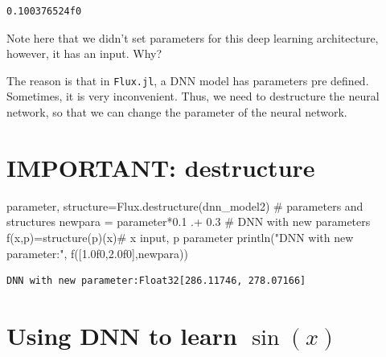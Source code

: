 \documentclass[
  letterpaper,
  DIV=11,
  numbers=noendperiod]{scrreport}
\newenvironment{Shaded}{\begin{snugshade}}{\end{snugshade}}
\newcommand{\CommentTok}[1]{\textcolor[rgb]{0.37,0.37,0.37}{#1}}
\newcommand{\FloatTok}[1]{\textcolor[rgb]{0.68,0.00,0.00}{#1}}
\newcommand{\FunctionTok}[1]{\textcolor[rgb]{0.28,0.35,0.67}{#1}}
\newcommand{\NormalTok}[1]{\textcolor[rgb]{0.00,0.23,0.31}{#1}}
\newcommand{\OperatorTok}[1]{\textcolor[rgb]{0.37,0.37,0.37}{#1}}
\newcommand{\StringTok}[1]{\textcolor[rgb]{0.13,0.47,0.30}{#1}}
\begin{document}
\begin{verbatim}
0.100376524f0
\end{verbatim}

Note here that we didn't set parameters for this deep learning
architecture, however, it has an input. Why?

The reason is that in \texttt{Flux.jl}, a DNN model has parameters pre
defined. Sometimes, it is very inconvenient. Thus, we need to
destructure the neural network, so that we can change the parameter of
the neural network.

\section{IMPORTANT: destructure}\label{important-destructure}

\begin{Shaded}
\begin{Highlighting}[]
\NormalTok{parameter, structure}\OperatorTok{=}\NormalTok{Flux.}\FunctionTok{destructure}\NormalTok{(dnn\_model2) }\CommentTok{\# parameters and structures}
\NormalTok{newpara }\OperatorTok{=}\NormalTok{ parameter}\OperatorTok{*}\FloatTok{0.1} \OperatorTok{.+} \FloatTok{0.3}
\CommentTok{\# DNN with new parameters}
\FunctionTok{f}\NormalTok{(x,p)}\OperatorTok{=}\FunctionTok{structure}\NormalTok{(p)(x)}\CommentTok{\# x input, p parameter}
\FunctionTok{println}\NormalTok{(}\StringTok{"DNN with new parameter:"}\NormalTok{, }\FunctionTok{f}\NormalTok{([}\FloatTok{1.0f0}\NormalTok{,}\FloatTok{2.0f0}\NormalTok{],newpara))}
\end{Highlighting}
\end{Shaded}

\begin{verbatim}
DNN with new parameter:Float32[286.11746, 278.07166]
\end{verbatim}

\section{\texorpdfstring{Using DNN to learn
\(\sin(x)\)}{Using DNN to learn \textbackslash sin(x)}}\label{using-dnn-to-learn-sinx}
\end{document}
